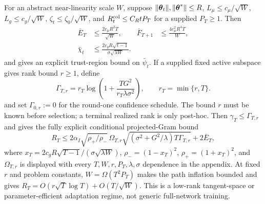 For an abstract near-linearity scale $W$, suppose
$\|\boldsymbol{\theta}_t\|,\|\boldsymbol{\theta}^*\|\le R$,
$L_\mu\le c_\mu/\sqrt W$, $L_g\le c_g/\sqrt W$,
$\zeta_t\le\zeta_0/\sqrt W$, and
$R_t^{\rm col}\le C_RtP_T$ for a supplied $P_T\ge1$.  Then
\begin{equation}\label{eq:near-linear-rates-main}
\begin{aligned}
 \bar E_T&\le\frac{2c_\mu R^2T}{\sqrt W},&
 \bar F_{T+1}&\le\frac{4c_\mu^2R^4T}{W},\\
 \bar\chi_t&\le\frac{2c_gR\sqrt{t-1}}{\sigma\sqrt{\lambda W}}.&&
\end{aligned}
\end{equation}
and  gives an explicit trust-region bound on
$\bar\psi_t$.  If a supplied fixed active subspace gives rank bound $r\ge1$,
define
\begin{equation}\label{eq:rank-gamma-main}
 \Gamma_{T,r}=r_T\log\!\left(1+\frac{TG^2}
 {r_T\lambda\sigma^2}\right),\qquad r_T=\min\{r,T\}.
\end{equation}
and set $\Gamma_{0,r}:=0$ for the round-one confidence schedule.  The bound
$r$ must be known before selection; a terminal realized rank is only post-hoc.
Then $\gamma_T\le\Gamma_{T,r}$ and  gives the
fully explicit conditional projected-Gram bound
\begin{equation}\label{eq:near-linear-regret-main}
R_T\le2\alpha_I\sqrt{\rho_+/\rho_-}\,\Omega_{T,r}
 \sqrt{(\sigma^2+G^2/\lambda)T\Gamma_{T,r}}+2\bar E_T,
\end{equation}
where $x_T=2c_gR\sqrt{T-1}/(\sigma\sqrt{\lambda W})$,
$\rho_-=(1-x_T)^2$, $\rho_+=(1+x_T)^2$, and $\Omega_{T,r}$ is displayed with every
$T,W,r,P_T,\lambda,\sigma$ dependence in the appendix.  At fixed $r$ and
problem constants, $W=\Omega(T^2P_T)$ makes the path inflation bounded and
gives $R_T=O(r\sqrt T\log T)+O(T/\sqrt W)$.  This is a low-rank tangent-space
or parameter-efficient adaptation regime, not generic full-network training.

